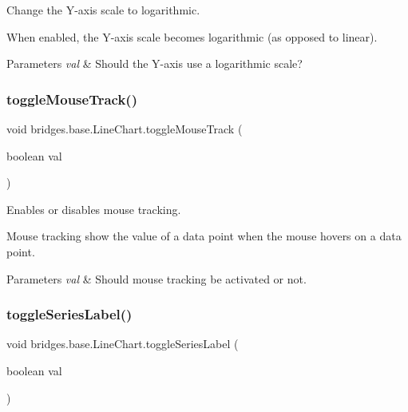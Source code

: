 Change the Y-\/axis scale to logarithmic. 

When enabled, the Y-\/axis scale becomes logarithmic (as opposed to linear).


\begin{DoxyParams}{Parameters}
{\em val} & Should the Y-\/axis use a logarithmic scale? \\
\hline
\end{DoxyParams}
\mbox{\label{classbridges_1_1base_1_1_line_chart_a095d16c1544cf373b8d2bf68ca864bd9}} 
\subsubsection{\texorpdfstring{toggleMouseTrack()}{toggleMouseTrack()}}
{\footnotesize\ttfamily void bridges.\+base.\+Line\+Chart.\+toggle\+Mouse\+Track (\begin{DoxyParamCaption}\item[{boolean}]{val }\end{DoxyParamCaption})}



Enables or disables mouse tracking. 

Mouse tracking show the value of a data point when the mouse hovers on a data point.


\begin{DoxyParams}{Parameters}
{\em val} & Should mouse tracking be activated or not. \\
\hline
\end{DoxyParams}
\mbox{\label{classbridges_1_1base_1_1_line_chart_adae74cfb09585727a96cf74ddf74d098}} 
\subsubsection{\texorpdfstring{toggleSeriesLabel()}{toggleSeriesLabel()}}
{\footnotesize\ttfamily void bridges.\+base.\+Line\+Chart.\+toggle\+Series\+Label (\begin{DoxyParamCaption}\item[{boolean}]{val }\end{DoxyParamCaption})}



